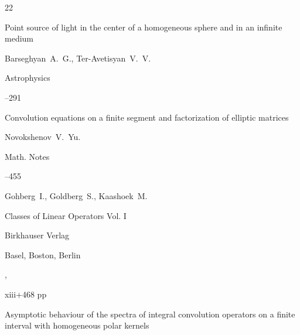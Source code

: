 \begin{thebibliography}{22}

\paper  Point source of light in the center of a homogeneous sphere and in an infinite medium

\by Barseghyan~A.~G., Ter-Avetisyan~V.~V.

\jour Astrophysics 




--291







\paper  Convolution equations on a finite segment and factorization of elliptic matrices

\by Novokshenov~V.~Yu.



\jour Math. Notes




--455






\by Gohberg~I.,  Goldberg~S., Kaashoek~M.

\book Classes of Linear Operators Vol. I

\publ Birkhauser Verlag

\publaddr Basel, Boston, Berlin 

,


xiii+468 pp







\paper Asymptotic behaviour of the spectra of integral convolution operators on a finite interval with homogeneous polar kernels


\end{thebibliography}
